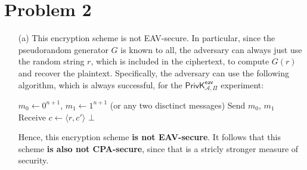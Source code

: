 \documentclass[12pt]{article}
\numberwithin{equation}{section}
\theoremstyle{plain}
\newcommand{\algo}[1]{\mathsf{#1}}
\newcommand{\adv}{\mathcal{A}}
\newcommand{\expir}[3]{\algo{PrivK}^{#1}_{{#2},{#3}}}
\newcommand{\eav}{\algo{eav}}
\begin{document}
\section*{Problem 2}

\begin{enumerate}

\item[(a)] This encryption scheme is not EAV-secure.
In particular, since the pseudorandom generator $G$ is known to all,
the adversary can always just use the random string $r$, which is included in the ciphertext,
to compute $G(r)$ and recover the plaintext.
Specifically, the adversary can use the following algorithm, which is always successful, for the $\expir{\eav}{\adv}{\Pi}$ experiment:
\begin{algorithm}[H]
\begin{algorithmic}
    \State $m_0 \gets 0^{n+1}$, $m_1 \gets 1^{n+1}$ (or any two disctinct messages)
    \State Send $m_0$, $m_1$
    \State Receive $c \gets \langle r, c' \rangle$
        \State {}
        \State {}
    \Else
        \State \Return $\bot$
    \EndIf
\EndProcedure
\end{algorithmic}
\end{algorithm}
Hence, this encryption scheme \textbf{is not EAV-secure}.
It follows that this scheme \textbf{is also not CPA-secure},
since that is a stricly stronger measure of security.


\end{enumerate}
\end{document}

